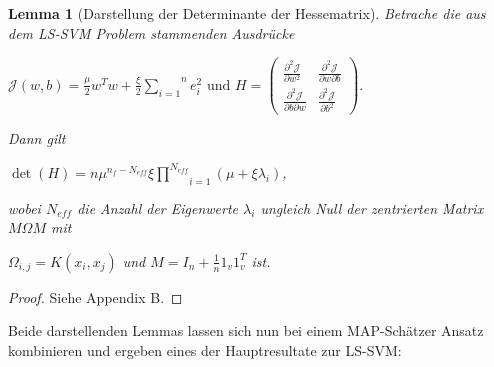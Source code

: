 \documentclass{report}
\theoremstyle{linebreak}
\newtheorem{lemma}[defi]{Lemma}
\begin{document}
\begin{lemma}[Darstellung der Determinante der Hessematrix]
Betrache die aus dem LS-SVM Problem stammenden Ausdrücke 
\begin{center}
	$\mathcal{J}(w,b) = \frac{\mu}{2}w^T w + \frac{\xi}{2}\overset{n}{\underset{i=1}			{\sum}} e_i ^2 \text{ und } H = \begin{pmatrix}
	\frac{\partial^2 \mathcal{J}}{\partial w^2 } & \frac{\partial^2 \mathcal{J}}				{\partial w \partial b } \\
	\frac{\partial^2 \mathcal{J}}{\partial b \partial w } & \frac{\partial^2 					\mathcal{J}}{\partial b^2 }
	\end{pmatrix}.$
\end{center}

Dann gilt

\begin{center}
	$\det(H) = n \mu^{n_f - N_{eff}} \xi \underset{i=1}{\overset{N_{eff}}{\prod}}(\mu + 			\xi \lambda_i)$,
\end{center}

wobei $N_{eff}$ die Anzahl der Eigenwerte $\lambda_i$ ungleich Null der zentrierten Matrix $M \Omega M$ mit
\begin{center}
	$\Omega_{i,j} = K(x_i, x_j)$ und $M = I_n + \frac{1}{n} 1_v 1_v^T$ ist.
\end{center}
\end{lemma}

\begin{proof}
Siehe \cite{LS-SVM} Appendix B.
\end{proof}

Beide darstellenden Lemmas lassen sich nun bei einem MAP-Schätzer Ansatz kombinieren und ergeben eines der Hauptresultate zur LS-SVM:
\end{document}
